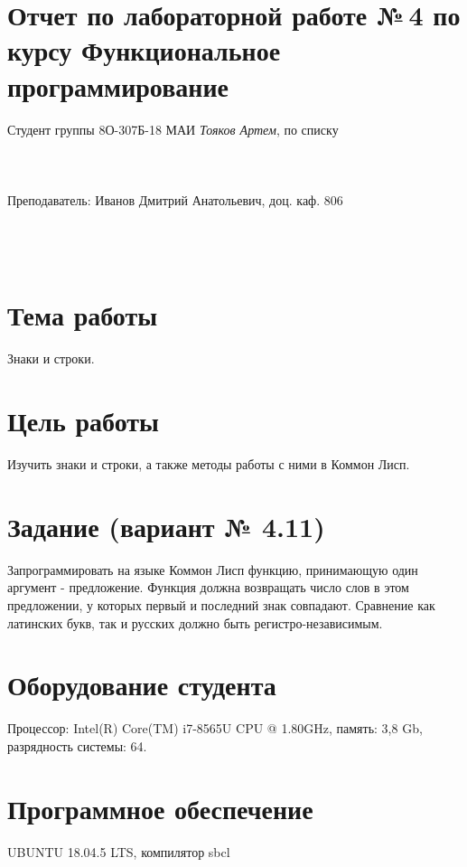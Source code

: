 \documentclass[12pt]{article}
\begin{document}
\section*{Отчет по лабораторной работе №\,4 
по курсу \guillemotleft  Функциональное программирование\guillemotright}
\begin{flushright}
Студент группы 8О-307Б-18 МАИ \textit{Тояков Артем},  по списку \\
 \\
 \\
\ \\
Преподаватель: Иванов Дмитрий Анатольевич, доц. каф. 806 \\
 \\
 \\
 \\

\end{flushright}

\section{Тема работы}
Знаки и строки.

\section{Цель работы}
Изучить знаки и строки, а также методы работы с ними в Коммон Лисп.

\section{Задание (вариант № 4.11)}
Запрограммировать на языке Коммон Лисп функцию, принимающую один аргумент - предложение. Функция должна возвращать число слов в этом предложении, у которых первый и последний знак совпадают. Сравнение как латинских букв, так и русских должно быть регистро-независимым.

\section{Оборудование студента}
Процессор: Intel(R) Core(TM) i7-8565U CPU @ 1.80GHz, память: 3,8 Gb, разрядность системы: 64.

\section{Программное обеспечение}
UBUNTU 18.04.5 LTS, компилятор sbcl
\end{document}
